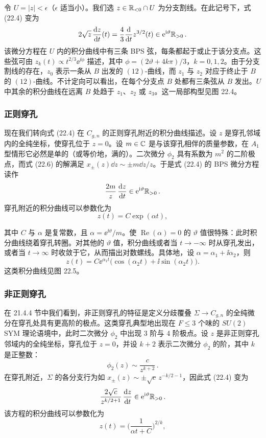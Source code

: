 令 $U=|z|<\epsilon$（$\epsilon$ 适当小）。我们选 $z\in\mathbb{R}_{<0}\cap U$ 为分支割线。在此记号下，式 (22.4) 变为
\[
2\sqrt{z}\,\frac{\mathrm{d} z}{\mathrm{d} t}(t)=\frac{4}{3}\frac{\mathrm{d}}{\mathrm{d} t}z^{3/2}(t)\in \mathrm{e}^{\mathrm{i}\vartheta}\mathbb{R}_{>0}\,.
\]
该微分方程在 $U$ 内的积分曲线中有三条 BPS 弦，每条都起于或止于该分支点。这些弦可由 $z_k(t)\propto t^{2/3}\ee^{\ii\phi}$ 描述，其中 $\phi=(2\vartheta+4k\pi)/3$，$k=0,1,2$。由于分支割线的存在，$z_0$ 表示一条从 $B$ 出发的 $(12)$-曲线，而 $z_1$ 与 $z_2$ 对应于终止于 $B$ 的 $(12)$-曲线。不计定向可以看出，在每个分支点 $B$ 处都有三条弦从 $B$ 发出。$U$ 中其余的积分曲线在远离 $B$ 处趋于 $z_1$、$z_2$ 或 $z_3$。这一局部构型见图 22.4。


\subsubsection*{正则穿孔}

现在我们转向式 (22.4) 在 $C_{g,n}$ 的正则穿孔附近的积分曲线描述。设 $z$ 是穿孔邻域内的全纯坐标，使穿孔位于 $z=0$。设 $m\in\mathbb{C}$ 是与该穿孔相伴的质量参数，在 $A_1$ 型情形它必然是单的（或等价地，满的）。二次微分 $\phi_2$ 具有系数为 $m^2$ 的二阶极点，而式 (22.6) 的解满足 $x_\pm(z)\dd z\sim\pm m\dd z/z$。于是式 (22.4) 的 BPS 微分方程读作
\[
\frac{2m}{z}\,\frac{\mathrm{d} z}{\mathrm{d} t}\in \mathrm{e}^{\mathrm{i}\vartheta}\mathbb{R}_{>0}\,.
\]
穿孔附近的积分曲线可以参数化为
\[
z(t)=C\exp(\alpha t),
\]

其中 $C$ 与 $\alpha$ 是复常数，且 $\alpha=\ee^{\ii\vartheta}/m$。使 $\operatorname{Re}(\alpha)=0$ 的 $\vartheta$ 值很特殊：此时积分曲线绕着穿孔转圈。对其他的 $\vartheta$ 值，积分曲线或者当 $t\to-\infty$ 时从穿孔发出，或者当 $t\to\infty$ 时收敛于它，从而描出对数螺线。具体地，设 $\alpha=\alpha_1+\ii\alpha_2$，则
\[
z(t)=C\ee^{\alpha_1 t}\big(\cos(\alpha_2 t)+\ii\sin(\alpha_2 t)\big).
\]
这类积分曲线见图 22.5。


\subsubsection*{非正则穿孔}

在 21.4.4 节中我们看到，非正则穿孔的特征是定义分歧覆叠 $\Sigma\to C_{g,n}$ 的全纯微分在穿孔处具有更高阶的极点。这类穿孔典型地出现在 $F\le3$ 个味的 $SU(2)$ SYM 理论语境中，此时二次微分 $\phi_2$ 中出现 3 阶与 4 阶极点。设 $z$ 是非正则穿孔邻域内的全纯坐标，穿孔位于 $z=0$，并设 $k+2$ 表示二次微分 $\phi_2$ 的阶，其中 $k$ 是正整数：
\[
\phi_2(z)\sim\frac{c}{z^{k+2}}\,.
\]
在穿孔附近，$\Sigma$ 的各分支行为如 $x_\pm(z)\sim\pm\sqrt{c}\,z^{-k/2-1}$，因此式 (22.4) 变为
\[
\frac{2\sqrt{c}}{z^{k/2+1}}\,\frac{\mathrm{d} z}{\mathrm{d} t}\in \mathrm{e}^{\mathrm{i}\vartheta}\mathbb{R}_{>0}\,.
\]
该方程的积分曲线可以参数化为
\[
z(t)=\Big(\frac{1}{\alpha t+C}\Big)^{2/k},
\]

